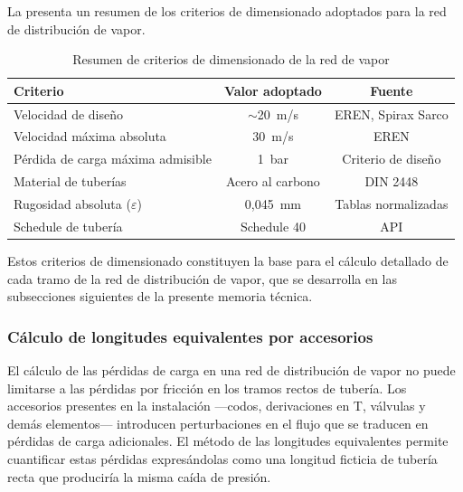 La  presenta un resumen de los criterios de dimensionado adoptados para la red de distribución de vapor.

\begin{table}[H]
	\centering
	\caption{Resumen de criterios de dimensionado de la red de vapor}
	\label{tab:resumen-criterios-dimensionado}
	\begin{tabular}{lcc}
		\toprule
		\textbf{Criterio}                  & \textbf{Valor adoptado} & \textbf{Fuente}     \\
		\midrule
		Velocidad de diseño                & $\sim$20~m/s            & EREN, Spirax Sarco  \\
		Velocidad máxima absoluta          & 30~m/s                  & EREN                \\
		Pérdida de carga máxima admisible  & 1~bar                   & Criterio de diseño  \\
		Material de tuberías               & Acero al carbono        & DIN 2448            \\
		Rugosidad absoluta ($\varepsilon$) & 0,045~mm                & Tablas normalizadas \\
		Schedule de tubería                & Schedule 40             & API                 \\
		\bottomrule
	\end{tabular}
\end{table}

Estos criterios de dimensionado constituyen la base para el cálculo detallado de cada tramo de la red de distribución de vapor, que se desarrolla en las subsecciones siguientes de la presente memoria técnica.


\subsubsection{Cálculo de longitudes equivalentes por accesorios}
\label{subsubsec:longitudes-equivalentes-accesorios}

El cálculo de las pérdidas de carga en una red de distribución de vapor no puede limitarse a las pérdidas por fricción en los tramos rectos de tubería. Los accesorios presentes en la instalación ---codos, derivaciones en T, válvulas y demás elementos--- introducen perturbaciones en el flujo que se traducen en pérdidas de carga adicionales. El método de las longitudes equivalentes permite cuantificar estas pérdidas expresándolas como una longitud ficticia de tubería recta que produciría la misma caída de presión.

